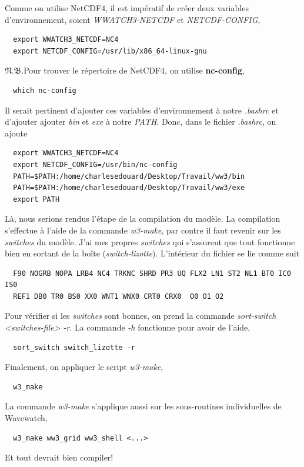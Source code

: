 \documentclass[10pt]{report}
\numberwithin{equation}{section}
\newcommand{\pt}{\hspace{1pt}} %
\newcommand{\nb}{\underline{{\footnotesize\EightStarConvex}\pt $\mathfrak{N.B.}$\vphantom{p}}\hspace{3pt}}
\begin{document}
Comme on utilise NetCDF4, il est impératif de créer deux variables d'environnement, soient \emph{WWATCH3-NETCDF} et \emph{NETCDF-CONFIG}, 
\begin{verbatim}
  export WWATCH3_NETCDF=NC4
  export NETCDF_CONFIG=/usr/lib/x86_64-linux-gnu
\end{verbatim}

\nb Pour trouver le répertoire de NetCDF4, on utilise \textbf{nc-config}, 
\begin{verbatim}
  which nc-config
\end{verbatim}

Il serait pertinent d'ajouter ces variables d'environnement à notre \emph{.bashrc} et d'ajouter ajouter \emph{bin} et \emph{exe} à notre \emph{PATH}.
Donc, dans le fichier \emph{.bashrc}, on ajoute
\begin{verbatim}
  export WWATCH3_NETCDF=NC4
  export NETCDF_CONFIG=/usr/bin/nc-config
  PATH=$PATH:/home/charlesedouard/Desktop/Travail/ww3/bin
  PATH=$PATH:/home/charlesedouard/Desktop/Travail/ww3/exe
  export PATH
\end{verbatim}
Là, nous serions rendus l'étape de la compilation du modèle.
La compilation s'effectue à l'aide de la commande \emph{w3-make}, par contre il faut revenir sur les \emph{switches} du modèle.
J'ai mes propres \emph{switches} qui s'assurent que tout fonctionne bien en sortant de la boîte (\emph{switch-lizotte}).
L'intérieur du fichier se lie comme suit
\begin{verbatim}
  F90 NOGRB NOPA LRB4 NC4 TRKNC SHRD PR3 UQ FLX2 LN1 ST2 NL1 BT0 IC0 IS0
  REF1 DB0 TR0 BS0 XX0 WNT1 WNX0 CRT0 CRX0  O0 O1 O2
\end{verbatim}
Pour vérifier si les \emph{switches} sont bonnes, on prend la commande \emph{sort-switch <switches-file> -r}.
La commande \emph{-h} fonctionne pour avoir de l'aide,
\begin{verbatim}
  sort_switch switch_lizotte -r
\end{verbatim}
Finalement, on appliquer le script \emph{w3-make},
\begin{verbatim}
  w3_make
\end{verbatim}
La commande \emph{w3-make} s'applique aussi sur les sous-routines individuelles de Wavewatch,
\begin{verbatim}
  w3_make ww3_grid ww3_shell <...>
\end{verbatim}
Et tout devrait bien compiler!
\end{document}
